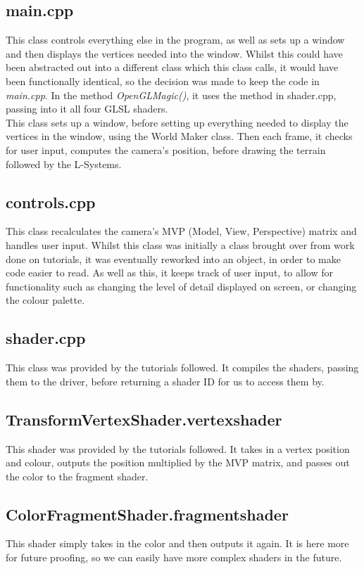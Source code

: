 \documentclass[a4paper,10pt]{report}
\begin{document}
\subsection{main.cpp} 

This class controls everything else in the program, as well as sets up a window and then displays the vertices needed into the window. Whilst this could have been abstracted out into a different class which this class calls, it would have been functionally identical, so the decision was made to keep the code in \textit{main.cpp}. In the method \textit{OpenGLMagic()}, it uses the method in shader.cpp, passing into it all four GLSL shaders. \\

This class sets up a window, before setting up everything needed to display the vertices in the window, using the World Maker class. Then each frame, it checks for user input, computes the camera's position, before drawing the terrain followed by the L-Systems.


\subsection{controls.cpp}

This class recalculates the camera's MVP (Model, View, Perspective) matrix and handles user input. Whilst this class was initially a class brought over from work done on tutorials, it was eventually reworked into an object, in order to make code easier to read. As well as this, it keeps track of user input, to allow for functionality such as changing the level of detail displayed on screen, or changing the colour palette. 

\subsection{shader.cpp}
This class was provided by the tutorials followed. It compiles the shaders, passing them to the driver, before returning a shader ID for us to access them by. 

\subsection{TransformVertexShader.vertexshader}
This shader was provided by the tutorials followed. It takes in a vertex position and colour, outputs the position multiplied by the MVP matrix, and passes out the color to the fragment shader.


\subsection{ColorFragmentShader.fragmentshader} This shader simply takes in the color and then outputs it again. It is here more for future proofing, so we can easily have more complex shaders in the future.  
\end{document}
